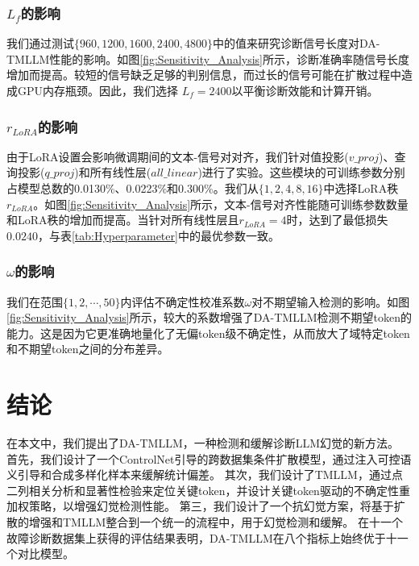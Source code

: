 \documentclass[UTF8,lettersize,journal]{IEEEtran}
\begin{document}
\subsubsection{$L_{f}$的影响} 我们通过测试$\{960, 1200, 1600, 2400, 4800\}$中的值来研究诊断信号长度对DA-TMLLM性能的影响。如图\ref{fig:Sensitivity_Analysis}所示，诊断准确率随信号长度增加而提高。较短的信号缺乏足够的判别信息，而过长的信号可能在扩散过程中造成GPU内存瓶颈。因此，我们选择
$L_{f} = 2400$以平衡诊断效能和计算开销。

\subsubsection{$r_{LoRA}$的影响} 由于LoRA设置会影响微调期间的文本-信号对对齐，我们针对值投影($v\_proj$)、查询投影($q\_proj$)和所有线性层($all\_linear$)进行了实验。这些模块的可训练参数分别占模型总数的0.0130\%、0.0223\%和0.300\%。我们从$\{1, 2, 4, 8, 16\}$中选择LoRA秩$r_{LoRA}$。如图\ref{fig:Sensitivity_Analysis}所示，文本-信号对齐性能随可训练参数数量和LoRA秩的增加而提高。当针对所有线性层且$r_{LoRA} = 4$时，达到了最低损失$0.0240$，与表\ref{tab:Hyperparameter}中的最优参数一致。

\subsubsection{$\omega$的影响} 我们在范围$\{1, 2, \cdots, 50\}$内评估不确定性校准系数$\omega$对不期望输入检测的影响。如图\ref{fig:Sensitivity_Analysis}所示，较大的系数增强了DA-TMLLM检测不期望token的能力。这是因为它更准确地量化了无偏token级不确定性，从而放大了域特定token和不期望token之间的分布差异。

\section{结论}
在本文中，我们提出了DA-TMLLM，一种检测和缓解诊断LLM幻觉的新方法。
首先，我们设计了一个ControlNet引导的跨数据集条件扩散模型，通过注入可控语义引导和合成多样化样本来缓解统计偏差。
其次，我们设计了TMLLM，通过点二列相关分析和显著性检验来定位关键token，并设计关键token驱动的不确定性重加权策略，以增强幻觉检测性能。
第三，我们设计了一个抗幻觉方案，将基于扩散的增强和TMLLM整合到一个统一的流程中，用于幻觉检测和缓解。
在十一个故障诊断数据集上获得的评估结果表明，DA-TMLLM在八个指标上始终优于十一个对比模型。



\newpage
\vfill
\end{document}
